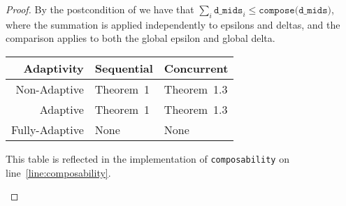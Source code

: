 \documentclass{article}
\begin{document}
\begin{proof}
  By the postcondition of  we have that $\sum_i \texttt{d\_mids}_i \le \texttt{compose(d\_mids)}$,
  where the summation is applied independently to epsilons and deltas, and the comparison applies to both the global epsilon and global delta.

  \begin{center}
    \begin{tabular}{ r | l l }
      Adaptivity & Sequential & Concurrent \\ 
      \hline
      Non-Adaptive & Theorem~1\cite{dwork2006gaussian} & Theorem~1.3\cite{vadhan2023concurrent} \\  
      Adaptive & Theorem~1\cite{dwork2006gaussian} & Theorem~1.3\cite{vadhan2023concurrent} \\
      Fully-Adaptive & None & None
    \end{tabular}

    This table is reflected in the implementation of \texttt{composability} on line~\ref{line:composability}.
  \end{center}
  
\end{proof}



\end{document}
